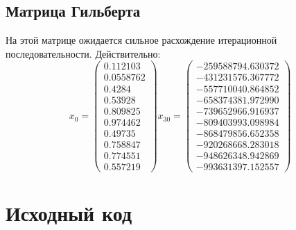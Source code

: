 \documentclass[../../report.tex]{subfiles}
\begin{document}
\subsection{Матрица Гильберта}
На этой матрице ожидается сильное расхождение итерационной последовательности. Действительно:
\[
x_0 = 
\begin{pmatrix}
0.112103 \\
0.0558762 \\
0.4284 \\
0.53928 \\
0.809825 \\
0.974462 \\
0.49735 \\
0.758847 \\
0.774551 \\
0.557219
\end{pmatrix}
x_{30} = 
\begin{pmatrix}
-259588794.630372 \\
-431231576.367772 \\
-557710040.864852 \\
-658374381.972990 \\ 
-739652966.916937 \\
-809403993.098984 \\
-868479856.652358 \\
-920268668.283018 \\
-948626348.942869 \\
-993631397.152557
\end{pmatrix}
\]
\section{Исходный код}
\end{document}
